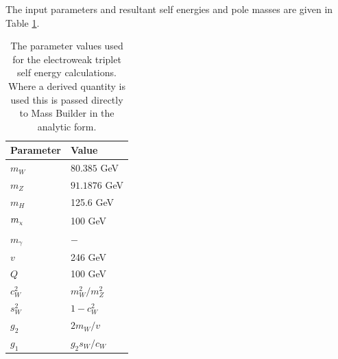 \documentclass[11pt]{article}
\newcommand{\mychi}{\raisebox{0pt}[1ex][1ex]{\tiny$\chi$}}
\def\mc{m_{\mychi}}
\newcommand{\mb}{\textsf{Mass Builder} }
\begin{document}
The input parameters and resultant self energies and pole masses are given in Table \ref{table:input_params}.

\begin{table}[h!]
\caption{The parameter values used for the electroweak triplet self energy calculations.  Where a derived quantity is used this is passed directly to \mb in the analytic form.}\label{table:input_params}
\centering
\vspace{0.5cm}
\begin{tabular}{l l}
\hline
Parameter & Value\\
\hline
$m_W$ & $80.385$ GeV \\
$m_Z$ & $91.1876$ GeV \\
$m_H$ & 125.6 GeV\\
$\mc$ & 100 GeV\\
$m_{\gamma}$ & $-$ \\
$v$ & 246 GeV \\
$Q$ & 100 GeV \\
$c_W^2$ & $m^2_W/m^2_Z$ \\
$s_W^2$ & $1-c^2_W$ \\
$g_2$ & $2m_W/v$\\
$g_1$ & $g_2 s_W/c_W$\\
\hline\end{tabular}
\end{table}
\end{document}
